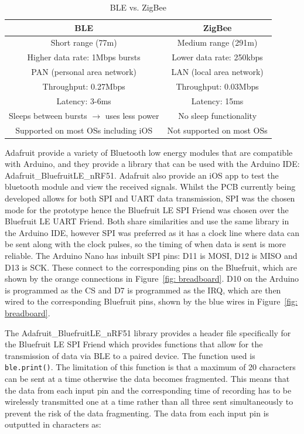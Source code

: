 \begin{table}[h!]
\centering
\begin{tabular}{||c c||} 
 \hline
 BLE & ZigBee \\ [0.5ex] 
 \hline\hline
 Short range (77m) & Medium range (291m) \\
 Higher data rate: 1Mbps bursts & Lower data rate: 250kbps \\ 
 PAN (personal area network) & LAN (local area network) \\
 Throughput: 0.27Mbps & Throughput: 0.03Mbps \\
 Latency: 3-6ms & Latency: 15ms \\
 Sleeps between bursts $\rightarrow$ uses less power & No sleep functionality \\
 Supported on most OSs including iOS & Not supported on most OSs \\
 \hline
\end{tabular}
\caption{BLE vs. ZigBee \cite{Ray2015, Christiano}}
\label{table:BLE vs ZigBee}
\end{table}

Adafruit provide a variety of Bluetooth low energy modules that are compatible with Arduino, and they provide a library that can be used with the Arduino IDE: Adafruit\_BluefruitLE\_nRF51. Adafruit also provide an iOS app to test the bluetooth module and view the received signals. Whilst the PCB currently being developed allows for both SPI and UART data transmission, SPI was the chosen mode for the prototype hence the Bluefruit LE SPI Friend was chosen over the Bluefruit LE UART Friend. Both share similarities and use the same library in the Arduino IDE, however SPI was preferred as it has a clock line where data can be sent along with the clock pulses, so the timing of when data is sent is more reliable. The Arduino Nano has inbuilt SPI pins: D11 is MOSI, D12 is MISO and D13 is SCK. These connect to the corresponding pins on the Bluefruit, which are shown by the orange connections in Figure~\ref{fig: breadboard}. D10 on the Arduino is programmed as the CS and D7 is programmed as the IRQ, which are then wired to the corresponding Bluefruit pins, shown by the blue wires in Figure~\ref{fig: breadboard}. 

The Adafruit\_BluefruitLE\_nRF51 library provides a header file specifically for the Bluefruit LE SPI Friend which provides functions that allow for the transmission of data via BLE to a paired device. The function used is {\tt{ble.print()}}. The limitation of this function is that a maximum of 20 characters can be sent at a time otherwise the data becomes fragmented. This means that the data from each input pin and the corresponding time of recording has to be wirelessly transmitted one at a time rather than all three sent simultaneously to prevent the risk of the data fragmenting. The data from each input pin is outputted in characters as:

